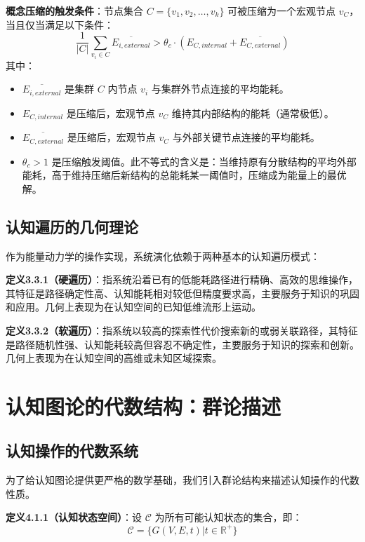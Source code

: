 \documentclass[12pt,a4paper]{article}
\newcommand{\cognitivespace}{\mathcal{C}}
\begin{document}
\textbf{概念压缩的触发条件}：节点集合 $C = \{v_1, v_2, \ldots, v_k\}$ 可被压缩为一个宏观节点 $v_C$，当且仅当满足以下条件：
\begin{equation}
\frac{1}{|C|}\sum_{v_i \in C} \overline{E_{i, external}} > \theta_c \cdot (E_{C, internal} + \overline{E_{C, external}})
\label{eq:compression_condition}
\end{equation}
其中：
\begin{itemize}
    \item $\overline{E_{i, external}}$ 是集群 $C$ 内节点 $v_i$ 与集群外节点连接的平均能耗。
    \item $E_{C, internal}$ 是压缩后，宏观节点 $v_C$ 维持其内部结构的能耗（通常极低）。
    \item $\overline{E_{C, external}}$ 是压缩后，宏观节点 $v_C$ 与外部关键节点连接的平均能耗。
    \item $\theta_c > 1$ 是压缩触发阈值。此不等式的含义是：当维持原有分散结构的平均外部能耗，高于维持压缩后新结构的总能耗某一阈值时，压缩成为能量上的最优解。
\end{itemize}

\subsection{认知遍历的几何理论}

作为能量动力学的操作实现，系统演化依赖于两种基本的认知遍历模式：

\textbf{定义3.3.1（硬遍历）}：指系统沿着已有的低能耗路径进行精确、高效的思维操作，其特征是路径确定性高、认知能耗相对较低但精度要求高，主要服务于知识的巩固和应用。几何上表现为在认知空间的已知低维流形上运动。

\textbf{定义3.3.2（软遍历）}：指系统以较高的探索性代价搜索新的或弱关联路径，其特征是路径随机性强、认知能耗较高但容忍不确定性，主要服务于知识的探索和创新。几何上表现为在认知空间的高维或未知区域探索。

\section{认知图论的代数结构：群论描述}

\subsection{认知操作的代数系统}

为了给认知图论提供更严格的数学基础，我们引入群论结构来描述认知操作的代数性质。

\textbf{定义4.1.1（认知状态空间）}：设 $\cognitivespace$ 为所有可能认知状态的集合，即：
\begin{equation}
\cognitivespace = \{G(V,E,t) | t \in \mathbb{R}^+\}
\end{equation}
\end{document}
